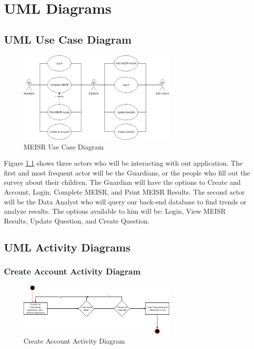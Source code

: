 \chapter{UML Diagrams}
\label{UML Diagrams}

\section{UML Use Case Diagram}

\begin{figure}[h]
  \centering
  \includegraphics[width=0.7\textwidth]{images/Use_Case_Diagram.png}
  \caption{MEISR Use Case Diagram}
  \label{fig:useCase}
\end{figure}

Figure \ref{fig:useCase} shows three actors who will be interacting with out application. The first and most frequent actor will be the Guardians, or the people who fill out the survey about their children. The Guardian will have the options to Create and Account, Login, Complete MEISR, and Print MEISR Results. The second actor will be the Data Analyst who will query our back-end database to find trends or analyze results. The options available to him will be: Login, View MEISR Results, Update Question, and Create Question.

\section{UML Activity Diagrams}

\subsection{Create Account Activity Diagram}

\begin{figure}[h]
  \centering
  \includegraphics[width=0.7\textwidth]{images/Create_Account_Activity_Diagram.png}
  \caption{Create Account Activity Diagram}
  \label{fig:createAccount}
\end{figure}

